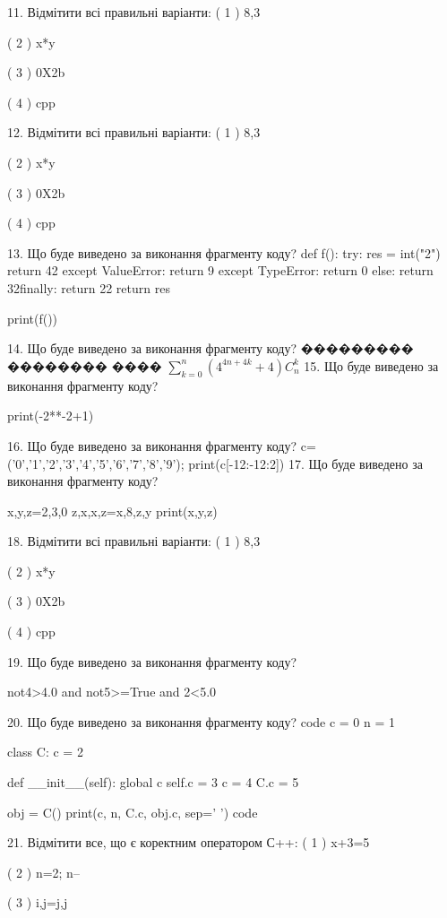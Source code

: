 \documentclass[11pt]{article}
\begin{document}
11. Відмітити всі правильні варіанти:
( 1 ) 8,3

( 2 ) x*y

( 3 ) 0X2b

( 4 ) cpp

12. Відмітити всі правильні варіанти:
( 1 ) 8,3

( 2 ) x*y

( 3 ) 0X2b

( 4 ) cpp

13. Що буде виведено за виконання фрагменту коду?
def f():
    try:
        res = int("2")
return 42    except ValueError: return 9
    except TypeError: return 0
else: return 32finally: return 22    return res

print(f())

14. Що буде виведено за виконання фрагменту коду?
��������� �������� ���� {$\sum\limits_{k=0}^{n} \left({{4^{4n+4k}}+4}\right){C_n^k}$}
15. Що буде виведено за виконання фрагменту коду?

print(-2**-2+1)

16. Що буде виведено за виконання фрагменту коду?
c=('0','1','2','3','4','5','6','7','8','9'); print(c[-12:-12:2])
17. Що буде виведено за виконання фрагменту коду?

x,y,z=2,3,0
z,x,x,z=x,8,z,y
print(x,y,z)

18. Відмітити всі правильні варіанти:
( 1 ) 8,3

( 2 ) x*y

( 3 ) 0X2b

( 4 ) cpp

19. Що буде виведено за виконання фрагменту коду?

not4>4.0 and not5>=True and 2<5.0

20. Що буде виведено за виконання фрагменту коду?
code
c = 0
n = 1

class C:
    c = 2
    
    def __init__(self):
global c        self.c = 3
        c = 4
        C.c = 5

obj = C()
print(c, n, C.c, obj.c, sep=' ')
code

21. Відмітити все, що є коректним оператором С++:
( 1 ) x+3=5

( 2 ) n=2; n--

( 3 ) i,j=j,j
\end{document}
